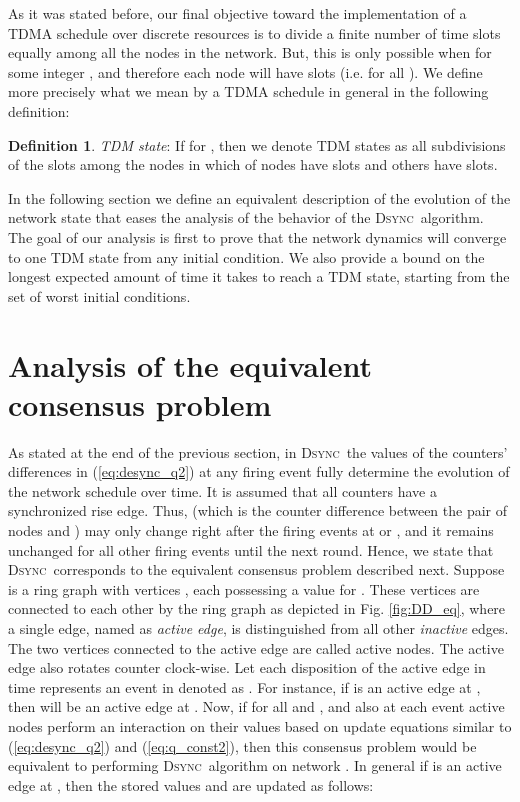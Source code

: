 \documentclass[conference]{IEEEtran}
\newcommand{\DDD}{\textsc{Dsync~}}
\theoremstyle{definition}
\theoremstyle{definition}
\newtheorem{definition}{Definition}
\begin{document}
As it was stated before, our final objective toward the implementation of a TDMA schedule over discrete resources is to divide a finite number of time slots equally among all the nodes in the network. But, this is only possible when  for some integer , and therefore each node will have  slots (i.e.  for all ). We define more precisely what we mean by a TDMA schedule in general in the following definition:
\begin{definition}
\emph{TDM state}: If  for , then we denote TDM states as all subdivisions of the slots among the nodes in which  of nodes have  slots and others have  slots.  
\end{definition}
In the following section we define an equivalent description of the evolution of the network state that eases the analysis of the behavior of the \DDD algorithm. The goal of our analysis is first to prove that the network dynamics will converge to one TDM state from any initial condition. We also provide a bound on the longest expected amount of time it takes to reach a TDM state, starting from the set of worst initial conditions.  
\section{Analysis of the equivalent consensus problem}\label{sec:equi_prob}
As stated at the end of the previous section, in \DDD the values of the counters' differences in (\ref{eq:desync_q2}) at any firing event fully determine the evolution of the network  schedule over time. It is assumed that all counters have a synchronized rise edge. Thus,  (which is the counter difference between the pair of nodes  and ) may only change right after the firing events at  or , and it remains unchanged for all other firing events until the next round. Hence, we state that \DDD corresponds to the equivalent consensus problem described next. 
Suppose  is a ring graph with  vertices , each possessing a value  for . These vertices are connected to each other by the ring graph  as depicted in Fig. \ref{fig:DD_eq}, where a single edge, named as \emph{active edge}, is distinguished from all other \emph{inactive} edges. The two vertices connected to the active edge are called active nodes. The active edge also rotates counter clock-wise. Let each disposition of the active edge in time represents an event in  denoted as . For instance, if  is an active edge at , then  will be an active edge at . Now, if  for all  and , and also at each event active nodes perform an interaction on their values based on update equations similar to (\ref{eq:desync_q2}) and (\ref{eq:q_const2}), then this consensus problem would be equivalent to performing \DDD algorithm on network . In general if  is an active edge at , then the stored values  and  are updated as follows:
\end{document}
